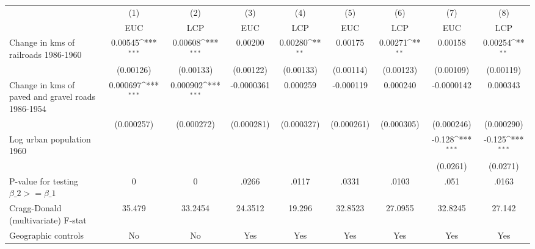 {
\def\sym#1{\ifmmode^{#1}\else\(^{#1}\)\fi}
\begin{tabular}{l*{8}{c}}
\hline\hline
                &\multicolumn{1}{c}{(1)}&\multicolumn{1}{c}{(2)}&\multicolumn{1}{c}{(3)}&\multicolumn{1}{c}{(4)}&\multicolumn{1}{c}{(5)}&\multicolumn{1}{c}{(6)}&\multicolumn{1}{c}{(7)}&\multicolumn{1}{c}{(8)}\\
                &\multicolumn{1}{c}{EUC}&\multicolumn{1}{c}{LCP}&\multicolumn{1}{c}{EUC}&\multicolumn{1}{c}{LCP}&\multicolumn{1}{c}{EUC}&\multicolumn{1}{c}{LCP}&\multicolumn{1}{c}{EUC}&\multicolumn{1}{c}{LCP}\\
\hline
Change in kms of railroads 1986-1960&  0.00545\sym{***}&  0.00608\sym{***}&  0.00200         &  0.00280\sym{**} &  0.00175         &  0.00271\sym{**} &  0.00158         &  0.00254\sym{**} \\
                &(0.00126)         &(0.00133)         &(0.00122)         &(0.00133)         &(0.00114)         &(0.00123)         &(0.00109)         &(0.00119)         \\
[1em]
Change in kms of paved and gravel roads 1986-1954& 0.000697\sym{***}& 0.000902\sym{***}&-0.0000361         & 0.000259         &-0.000119         & 0.000240         &-0.0000142         & 0.000343         \\
                &(0.000257)         &(0.000272)         &(0.000281)         &(0.000327)         &(0.000261)         &(0.000305)         &(0.000246)         &(0.000290)         \\
[1em]
Log urban population 1960&                  &                  &                  &                  &                  &                  &   -0.128\sym{***}&   -0.125\sym{***}\\
                &                  &                  &                  &                  &                  &                  & (0.0261)         & (0.0271)         \\
\hline
P-value for testing $\beta\_{2} >= \beta\_{1}$&        0         &        0         &    .0266         &    .0117         &    .0331         &    .0103         &     .051         &    .0163         \\
Cragg-Donald (multivariate) F-stat&   35.479         &  33.2454         &  24.3512         &   19.296         &  32.8523         &  27.0955         &  32.8245         &   27.142         \\
Geographic controls&       No         &       No         &      Yes         &      Yes         &      Yes         &      Yes         &      Yes         &      Yes         \\

\end{tabular}}

